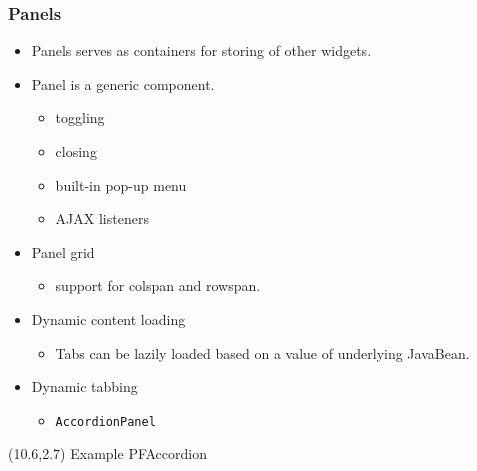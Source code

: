 \documentclass[10pt,xcolor=pdflatex]{beamer}
\begin{document}
\begin{frame}\frametitle{Panels}
  \begin{itemize}
    \item Panels serves as containers for storing of other widgets.
	\item Panel is a generic component.
	  \begin{itemize}
		\item toggling
		\item closing
		\item built-in pop-up menu
		\item AJAX listeners
	  \end{itemize}
    \item Panel grid
	  \begin{itemize}
		\item support for colspan and rowspan.
	  \end{itemize}
    \item Dynamic content loading
      \begin{itemize}
    	\item Tabs can be lazily loaded based on a value of underlying JavaBean.
      \end{itemize}
    \item Dynamic tabbing
      \begin{itemize}
  		 \item \texttt{AccordionPanel}
      \end{itemize}
  \end{itemize}
\begin{textblock}{10}(10.6,2.7)
    {\footnotesize Example PFAccordion}
\end{textblock}
\end{frame}
\end{document}

